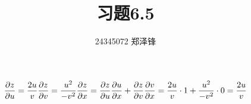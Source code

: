 \documentclass[lang=cn,a4paper,newtx]{elegantpaper}
\title{习题6.5}
\author{24345072 郑泽锋}
\begin{document}
    \begin{equation}
        \frac{\partial z}{\partial u} = \frac{2u}{v} \\
        \frac{\partial z}{\partial v} = \frac{u^2}{-v^2} \\
        \frac{\partial z}{\partial x} = \frac{\partial z}{\partial u} \frac{\partial u}{\partial x} + \frac{\partial z}{\partial v} \frac{\partial v}{\partial x} = \frac{2u}{v} \cdot 1 + \frac{u^2}{-v^2} \cdot 0 = \frac{2u}{v} \\
    \end{equation}
\end{document}
